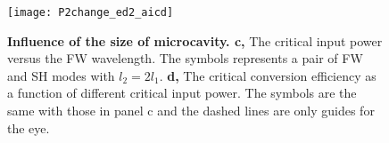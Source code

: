 \begin{figure}
\texttt{[image: P2change\_ed2\_aicd]}
\centering
\caption{\textbf{Influence of the size of microcavity. c,} The critical input power versus the FW wavelength. The symbols represents a pair of FW and SH modes with $l_2=2l_1$.  \textbf{d, }The critical conversion efficiency as a function of different critical input power. The symbols are the same with those in panel c and the dashed lines are only guides for the eye. }
\label{pic:P2change_ed2_aicd}
\end{figure}